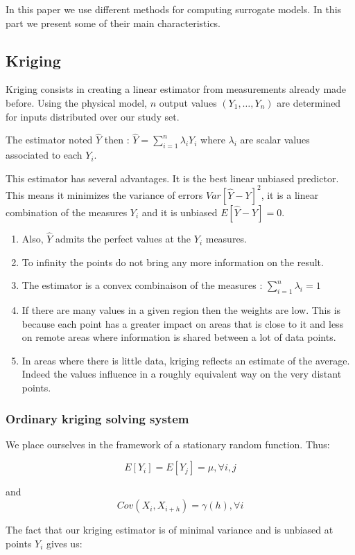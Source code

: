 \documentclass[hidelinks,12pt]{article}
\begin{document}
In this paper we use different methods for computing surrogate models. In this part we present some of their main characteristics.


\subsection{Kriging}

Kriging consists in creating a linear estimator from measurements already made before. Using the physical model, $n$ output values $(Y_1,\ldots,Y_n)$ are determined for inputs distributed over our study set. 

The estimator noted $\hat{Y}$ then : $\hat{Y}=\sum_{i=1}^{n}\lambda_i Y_i$ where $\lambda_i$ are scalar values associated to each $Y_i$.

This estimator has several advantages. It is the best linear unbiased predictor. This means it minimizes the variance of errors $Var[\hat{Y}-Y]^2$, it is a linear combination of the measures $Y_i$ and it is unbiased $E[\hat{Y}-Y]=0$.
\begin{enumerate}
\item Also, $\hat{Y}$ admits the perfect values at the $Y_i$ measures.
\item To infinity the points do not bring any more information on the result.
\item The estimator is a convex combinaison of the measures : $\sum_{i=1}^{n}\lambda_i=1$
\item If there are many values in a given region then the weights are low. This is because each point has a greater impact on areas that is close to it and less on remote areas where information is shared between a lot of data points.
\item In areas where there is little data, kriging reflects an estimate of the average. Indeed the values influence in a roughly equivalent way on the very distant points.
\end{enumerate}

\subsubsection{Ordinary kriging solving system}
We place ourselves in the framework of a stationary random function. Thus:

$$E[Y_i]=E[Y_j]=\mu, \forall i,j$$

and $$Cov(X_i,X_{i+h})=\gamma(h), \forall i$$

The fact that our kriging estimator is of minimal variance and is unbiased at points $Y_i$ gives us:
\end{document}
